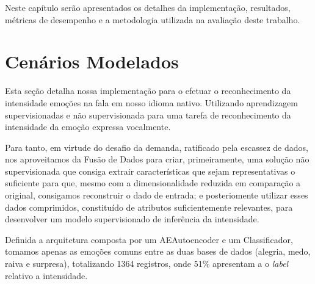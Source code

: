 
Neste capítulo serão apresentados os detalhes da implementação, resultados, métricas de desempenho e a metodologia utilizada na avaliação deste trabalho.\\

\section{Cenários Modelados}\label{sec:implementacao}

Esta seção detalha nossa implementação para o efetuar o reconhecimento da intensidade emoções na fala em nosso idioma nativo. Utilizando aprendizagem supervisionadas e não supervisionada para uma tarefa de reconhecimento da intensidade da emoção expressa vocalmente.

Para tanto, em virtude do desafio da demanda, ratificado pela escassez de dados, nos aproveitamos da Fusão de Dados para criar, primeiramente, uma solução não supervisionada que consiga extrair características que sejam representativas o suficiente para que, mesmo com a dimensionalidade reduzida em comparação a original, consigamos reconstruir o dado de entrada; e posteriomente utilizar esses dados comprimidos, constituído de atributos suficientemente relevantes, para desenvolver um modelo supervisionado de inferência da intensidade.

Definida a arquitetura composta por um \acrlong{AE}Autoencoder e um Classificador, tomamos apenas as emoções comuns entre as duas bases de dados (alegria, medo, raiva e surpresa), totalizando 1364 registros, onde 51\% apresentam a o \textit{label} relativo a intensidade. %


